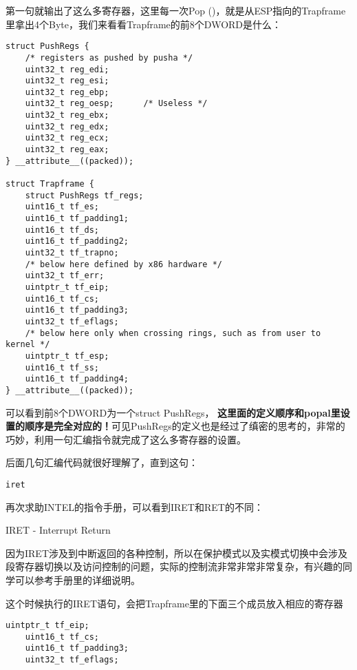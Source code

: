 \documentclass{article}
\newcommand{\highlight}[1]{{\bfseries \color{red}  #1}}
\begin{document}
\begin{CJK*}{UTF8}{gkai}
第一句就输出了这么多寄存器，这里每一次Pop ()，就是从ESP指向的Trapframe里拿出4个Byte，我们来看看Trapframe的前8个DWORD是什么：

\begin{lstlisting}[style=ccode, title={\scriptsize \ttfamily \bfseries inc/trap.h}]
struct PushRegs {
	/* registers as pushed by pusha */
	uint32_t reg_edi;
	uint32_t reg_esi;
	uint32_t reg_ebp;
	uint32_t reg_oesp;		/* Useless */
	uint32_t reg_ebx;
	uint32_t reg_edx;
	uint32_t reg_ecx;
	uint32_t reg_eax;
} __attribute__((packed));

struct Trapframe {
	struct PushRegs tf_regs;
	uint16_t tf_es;
	uint16_t tf_padding1;
	uint16_t tf_ds;
	uint16_t tf_padding2;
	uint32_t tf_trapno;
	/* below here defined by x86 hardware */
	uint32_t tf_err;
	uintptr_t tf_eip;
	uint16_t tf_cs;
	uint16_t tf_padding3;
	uint32_t tf_eflags;
	/* below here only when crossing rings, such as from user to kernel */
	uintptr_t tf_esp;
	uint16_t tf_ss;
	uint16_t tf_padding4;
} __attribute__((packed));
\end{lstlisting}

可以看到前8个DWORD为一个struct PushRegs，\highlight{这里面的定义顺序和popal里设置的顺序是完全对应的！}可见PushRegs的定义也是经过了缜密的思考的，非常的巧妙，利用一句汇编指令就完成了这么多寄存器的设置。

后面几句汇编代码就很好理解了，直到这句：

\begin{lstlisting}[style=acode, firstnumber=5]
        iret
\end{lstlisting}

再次求助INTEL的指令手册，可以看到IRET和RET的不同：

\begin{algorithm}[htp]
\dontprintsemicolon
{}
\caption{IRET - Interrupt Return}
\end{algorithm}

因为IRET涉及到中断返回的各种控制，所以在保护模式以及实模式切换中会涉及段寄存器切换以及访问控制的问题，实际的控制流非常非常非常复杂，有兴趣的同学可以参考手册里的详细说明。

这个时候执行的IRET语句，会把Trapframe里的下面三个成员放入相应的寄存器

\begin{lstlisting}[style=ccode, numbers=none]
	uintptr_t tf_eip;
	uint16_t tf_cs;
	uint16_t tf_padding3;
	uint32_t tf_eflags;
\end{lstlisting}


\end{CJK*}
\end{document}
